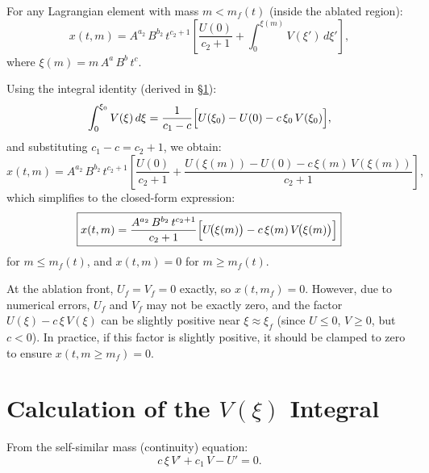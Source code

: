 \documentclass[11pt]{article}
\begin{document}
For any Lagrangian element with mass $m < m_f(t)$ (inside the ablated region):
\begin{equation}
  x(t,m) = A^{a_2}\,B^{b_2}\,t^{c_2+1}
    \left[\frac{U(0)}{c_2+1} + \int_0^{\xi(m)} V(\xi')\,d\xi'\right],
  \label{eq:x_tm_integral}
\end{equation}
where $\xi(m) = m\,A^{a}\,B^{b}\,t^{c}$.

Using the integral identity (derived in \S\ref{sec:V_integral_proof}):
\begin{equation}
  \int_0^{\xi_0} V(\xi)\,d\xi
  = \frac{1}{c_1 - c}\Bigl[U(\xi_0) - U(0) - c\,\xi_0\,V(\xi_0)\Bigr],
  \label{eq:V_integral_general}
\end{equation}
and substituting $c_1 - c = c_2 + 1$, we obtain:
\begin{equation}
  x(t,m) = A^{a_2}\,B^{b_2}\,t^{c_2+1}
    \left[\frac{U(0)}{c_2+1}
    + \frac{U(\xi(m)) - U(0) - c\,\xi(m)\,V(\xi(m))}{c_2+1}\right],
\end{equation}
which simplifies to the closed-form expression:
\begin{equation}
  \boxed{
  x(t,m) = \frac{A^{a_2}\,B^{b_2}\,t^{c_2+1}}{c_2 + 1}
    \Bigl[U\!\bigl(\xi(m)\bigr) - c\,\xi(m)\,V\!\bigl(\xi(m)\bigr)\Bigr]}
  \label{eq:x_tm_closed}
\end{equation}
for $m \leq m_f(t)$, and $x(t,m) = 0$ for $m \geq m_f(t)$.

\begin{notebox}
At the ablation front, $U_f = V_f = 0$ exactly, so $x(t,m_f) = 0$. However, due to numerical errors, $U_f$ and $V_f$ may not be exactly zero, and the factor $U(\xi) - c\,\xi\,V(\xi)$ can be slightly positive near $\xi \approx \xi_f$ (since $U \leq 0$, $V \geq 0$, but $c < 0$). In practice, if this factor is slightly positive, it should be clamped to zero to ensure $x(t, m \geq m_f) = 0$.
\end{notebox}

\section{Calculation of the $V(\xi)$ Integral}
\label{sec:V_integral_proof}

From the self-similar mass (continuity) equation:
\begin{equation}
  c\,\xi\,V' + c_1\,V - U' = 0.
  \label{eq:ss_mass}
\end{equation}
\end{document}

